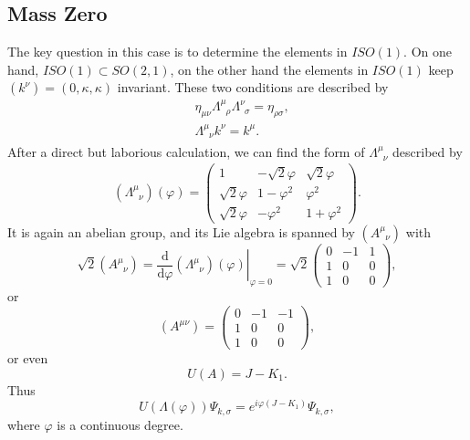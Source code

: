 \documentclass[11pt]{article}
\begin{document}
\subsection{Mass Zero}
The key question in this case is to determine the elements in $ISO\left(1\right)$. On one hand, $ISO\left(1\right) \subset SO\left(2,1\right)$, on the other hand the elements in $ISO\left(1\right)$ keep $\left(k^\nu \right)=\left(0,\kappa,\kappa\right)$ invariant. These two conditions are described by
\begin{align}
	&\eta_{\mu\nu}\Lambda^{\mu}_{\phantom{\mu}\rho}\Lambda^{\nu}_{\phantom{\nu}\sigma}=\eta_{\rho\sigma},\\
	&\Lambda^{\mu}_{\phantom{\mu}\nu} k^\nu=k^\mu.
\end{align}
After a direct but laborious calculation, we can find the form of $\Lambda^{\mu}_{\phantom{\mu}\nu}$ described by
\begin{equation}
\label{ISO(1)}
	\left(\Lambda^{\mu}_{\phantom{\mu}\nu}\right)\left(\varphi\right)=
	\begin{pmatrix}
		1 & -\sqrt{2}\varphi &\sqrt{2}\varphi\\
		\sqrt{2}\varphi &1-\varphi^2 &\varphi^2\\
		\sqrt{2}\varphi &-\varphi^2 &1+\varphi^2
	\end{pmatrix}.
\end{equation}
It is again an abelian group, and its Lie algebra is spanned by $\left(A^{\mu}_{\phantom{\mu}\nu}\right)$ with
\[
	\sqrt{2}\left(A^{\mu}_{\phantom{\mu}\nu}\right)=
	\left.\frac{\mathrm{d}}{\mathrm{d}\varphi}\left(\Lambda^{\mu}_{\phantom{\mu}\nu}\right)\left(\varphi\right)\right|_{\varphi=0}
	=\sqrt{2}
	\begin{pmatrix}
		0 &-1 &1\\
		1 &0  &0\\
		1 &0  &0
	\end{pmatrix},
\]
or
\[
	\left(A^{\mu\nu}\right)
	=
	\begin{pmatrix}
		0 &-1 &-1\\
		1 &0  &0\\
		1 &0  &0
	\end{pmatrix},
\]
or even
\begin{equation}
	U\left(A\right)=J-K_1.
\end{equation}
Thus
\begin{equation}
	U\left(\Lambda\left(\varphi\right)\right)\Psi_{k,\sigma}=e^{i\varphi\left(J-K_1\right)}\Psi_{k,\sigma},
\end{equation}
where $\varphi$ is a continuous degree.
\end{document}
